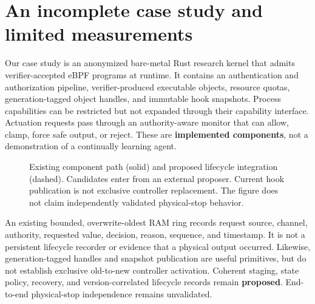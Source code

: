 \documentclass{article}
\begin{document}
\section{An incomplete case study and limited measurements}
\label{sec:prototype}
Our case study is an anonymized bare-metal Rust research kernel that admits verifier-accepted eBPF programs at runtime. It contains an authentication and authorization pipeline, verifier-produced executable objects, resource quotas, generation-tagged object handles, and immutable hook snapshots. Process capabilities can be restricted but not expanded through their capability interface. Actuation requests pass through an authority-aware monitor that can allow, clamp, force safe output, or reject. These are \textbf{implemented components}, not a demonstration of a continually learning agent.

\begin{figure}[t]
\centering
{}
\caption{Existing component path (solid) and proposed lifecycle integration (dashed). Candidates enter from an external proposer. Current hook publication is not exclusive controller replacement. The figure does not claim independently validated physical-stop behavior.}
\label{fig:boundary}
\end{figure}

An existing bounded, overwrite-oldest RAM ring records request source, channel, authority, requested value, decision, reason, sequence, and timestamp. It is not a persistent lifecycle recorder or evidence that a physical output occurred. Likewise, generation-tagged handles and snapshot publication are useful primitives, but do not establish exclusive old-to-new controller activation. Coherent staging, state policy, recovery, and version-correlated lifecycle records remain \textbf{proposed}. End-to-end physical-stop independence remains unvalidated.
\end{document}
